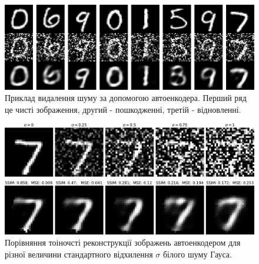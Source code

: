 \documentclass[14pt,a4paper]{extarticle}
\newcounter{e}
\numberwithin{equation}{section}
\numberwithin{figure}{section}
\begin{document}
	\begin{figure}[H]
		\centering
		\includegraphics[width=1\textwidth]{resources/autoencoder-denoising-samples.pdf}
		\caption{Приклад видалення шуму за допомогою автоенкодера. Перший ряд це чисті зображення, другий - пошкодженні, третій - відновленні. }
		\label{fig:autoencoder-denoising-samples}
	\end{figure}
	
	\begin{figure}[H]
		\centering
		\includegraphics[width=1\textwidth]{resources/denoising-awgn-comparation.pdf}
		\caption{Порівняння тоіночсті реконструкції зображень автоенкодером для різної величини стандартного відхилення $\sigma$ білого шуму Гауса.}
		\label{fig:denoising-awgn-comparation}
	\end{figure}
	

	\newpage
	\thispagestyle{empty}
	\printbibliography[title={Література}]

\end{document}
